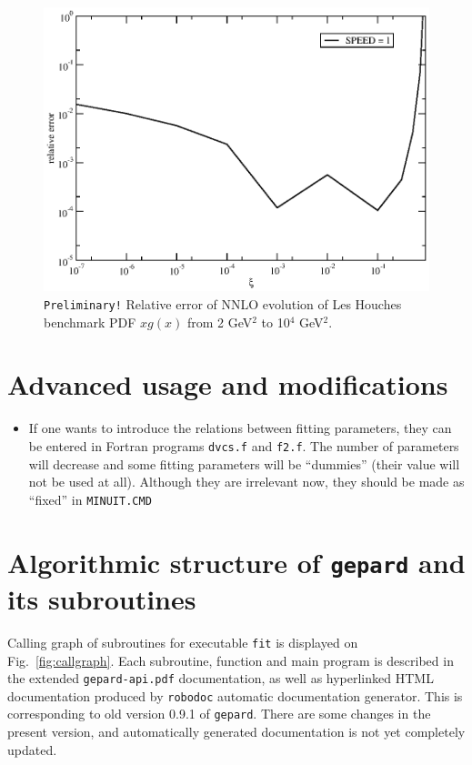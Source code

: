 \documentclass[12pt]{article}
\begin{document}
\begin{figure}
\begin{center}
\includegraphics[scale=0.8]{PDFevolNNLO}
\end{center}
\caption{\texttt{Preliminary!} Relative error of NNLO evolution of Les Houches benchmark PDF $x g(x)$
from 2 GeV$^2$ to 10$^4$ GeV$^2$.}
\label{fig:PDFevolNNLO}
\end{figure}

\section{Advanced usage and modifications}

\begin{itemize}
\item If one wants to introduce the relations between fitting parameters, they
can be entered in Fortran programs \texttt{dvcs.f} and \texttt{f2.f}.
The number of parameters will decrease and some fitting parameters 
will be ``dummies'' (their value will not be used at all). 
Although they are irrelevant now, they should be made as
``fixed'' in \texttt{MINUIT.CMD}
\end{itemize}


\section{Algorithmic structure of \texttt{gepard} and its subroutines}

Calling graph of subroutines for executable \texttt{fit} is displayed on
Fig.~\ref{fig:callgraph}. Each subroutine,
function and main program is described in the extended \texttt{gepard-api.pdf} documentation,
as well as hyperlinked HTML documentation produced by \texttt{robodoc} automatic
documentation generator. This is corresponding to old version 0.9.1 of \texttt{gepard}.
There are some changes in the present version, and automatically generated documentation
is not yet completely updated.
\end{document}
